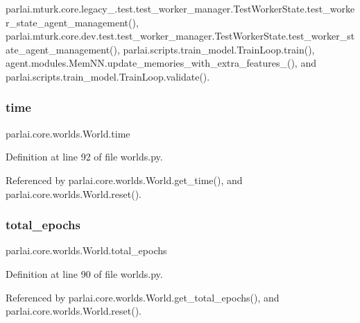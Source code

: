 parlai.\+mturk.\+core.\+legacy\+\_.\+test.\+test\+\_\+worker\+\_\+manager.\+Test\+Worker\+State.\+test\+\_\+worker\+\_\+state\+\_\+agent\+\_\+management(), parlai.\+mturk.\+core.\+dev.\+test.\+test\+\_\+worker\+\_\+manager.\+Test\+Worker\+State.\+test\+\_\+worker\+\_\+state\+\_\+agent\+\_\+management(), parlai.\+scripts.\+train\+\_\+model.\+Train\+Loop.\+train(), agent.\+modules.\+Mem\+N\+N.\+update\+\_\+memories\+\_\+with\+\_\+extra\+\_\+features\+\_\+(), and parlai.\+scripts.\+train\+\_\+model.\+Train\+Loop.\+validate().

\mbox{\label{classparlai_1_1core_1_1worlds_1_1World_a3246107ea5a86b97cef9164286b39925}} 
\subsubsection{\texorpdfstring{time}{time}}
{\footnotesize\ttfamily parlai.\+core.\+worlds.\+World.\+time}



Definition at line 92 of file worlds.\+py.



Referenced by parlai.\+core.\+worlds.\+World.\+get\+\_\+time(), and parlai.\+core.\+worlds.\+World.\+reset().

\mbox{\label{classparlai_1_1core_1_1worlds_1_1World_a296f0478da2696d33dde49adb135fa17}} 
\subsubsection{\texorpdfstring{total\+\_\+epochs}{total\_epochs}}
{\footnotesize\ttfamily parlai.\+core.\+worlds.\+World.\+total\+\_\+epochs}



Definition at line 90 of file worlds.\+py.



Referenced by parlai.\+core.\+worlds.\+World.\+get\+\_\+total\+\_\+epochs(), and parlai.\+core.\+worlds.\+World.\+reset().

